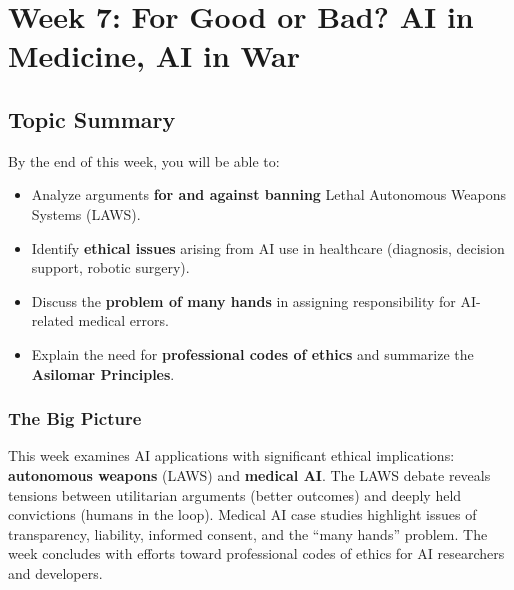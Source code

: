 \section{Week 7: For Good or Bad? AI in Medicine, AI in War}

\subsection{Topic Summary}

\begin{keybox}
By the end of this week, you will be able to:
\begin{itemize}
  \item Analyze arguments \textbf{for and against banning} Lethal Autonomous Weapons Systems (LAWS).
  \item Identify \textbf{ethical issues} arising from AI use in healthcare (diagnosis, decision support, robotic surgery).
  \item Discuss the \textbf{problem of many hands} in assigning responsibility for AI-related medical errors.
  \item Explain the need for \textbf{professional codes of ethics} and summarize the \textbf{Asilomar Principles}.
\end{itemize}
\end{keybox}

\separator

\subsubsection*{The Big Picture}

This week examines AI applications with significant ethical implications: \textbf{autonomous weapons} (LAWS) and \textbf{medical AI}. The LAWS debate reveals tensions between utilitarian arguments (better outcomes) and deeply held convictions (humans in the loop). Medical AI case studies highlight issues of transparency, liability, informed consent, and the ``many hands'' problem. The week concludes with efforts toward professional codes of ethics for AI researchers and developers.

